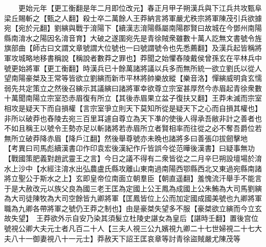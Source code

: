 　　更始元年【更工衡翻是年二月即位改元】春正月甲子朔漢兵與下江兵共攻甄阜梁丘賜斬之【甄之人翻】殺士卒二萬餘人王莽納言將軍嚴尤秩宗將軍陳茂引兵欲據宛【宛於元翻】劉縯與戰于淯陽下【續漢志淯陽縣屬南陽郡賢曰故城在今鄧州南陽縣南淯水之陽因名淯音育】大破之遂圍宛先是青徐賊衆雖數十萬人訖無文書號令旌旗部曲【師古曰文謂文章號謂大位號也一曰號謂號令也先悉薦翻】及漢兵起皆稱將軍攻城略地移書稱說【稱說者數莽之罪也】莽聞之始懼舂陵戴侯曾孫玄在平林兵中號更始將軍【更工衡翻】時漢兵已十餘萬諸將議以兵多而無所統一欲立劉氏以從人望南陽豪桀及王常等皆欲立劉縯而新市平林將帥樂放縱【樂音洛】憚縯威明貪玄懦弱先共定策立之然後召縯示其議縯曰諸將軍幸欲尊立宗室甚厚然今赤眉起青徐衆數十萬聞南陽立宗室恐赤眉復有所立【其後赤眉果立盆子復扶又翻】王莽未滅而宗室相攻是疑天下而自損權【言宗室爭立則天下莫知所從是疑天下之心而自損其權也】非所以破莽也舂陵去宛三百里耳遽自尊立為天下凖的使後人得承吾敝非計之善者也不如且稱王以號令王勢亦足以斬諸將若赤眉所立者賢相率而往從之必不奪吾爵位若無所立破莽降赤眉【降戶江翻】然後舉尊號亦未晩也諸將多曰善張卬拔劒擊地　【考異曰司馬彪續漢書卬作印袁宏後漢紀作斤皆誤今從范曄後漢書】曰疑事無功【戰國策肥義對趙武靈王之言】今日之議不得有二衆皆從之二月辛巳朔設壇場於淯水上沙中【水經注淯水出弘農盧氏縣攻離山東南過南陽西鄂縣西北又東過宛縣南諸將立聖公于斯水之上】玄即皇帝位南面立朝羣臣【朝直遥翻】羞愧流汗舉手不能言于是大赦改元以族父良為國三老王匡為定國上公王鳳為成國上公朱鮪為大司馬劉縯為大司徒陳牧為大司空餘皆九卿將軍【匡鳳皆位上公而加定國成國美號也九卿將軍職為九卿各帶將軍之號仍王莽之制也】由是豪桀失望多不服【豪桀欲立縯而今立玄故失望】　王莽欲外示自安乃染其須髮立杜陵史諶女為皇后【諶時壬翻】置後宫位號視公卿大夫元士者凡百二十人【三夫人視三公九嬪視九卿二十七世婦視二十七大夫八十一御妻視八十一元士】莽赦天下詔王匡哀章等討青徐盜賊嚴尤陳茂等

